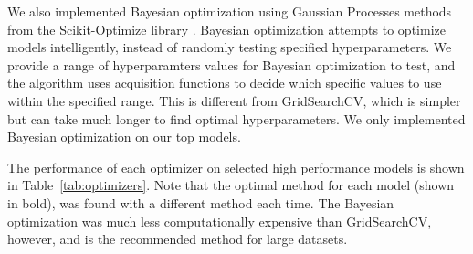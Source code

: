 \documentclass[twocolumn, nofootinbib, secnumarabic, amssymb, nobibnotes, aps, prd]{revtex4-2}
\begin{document}
We also implemented Bayesian optimization using Gaussian Processes methods from the Scikit-Optimize library \cite{head_tim_2021_5565057}. Bayesian optimization attempts to optimize models intelligently, instead of randomly testing specified hyperparameters. We provide a range of hyperparamters values for Bayesian optimization to test, and the algorithm uses acquisition functions to decide which specific values to use within the specified range. This is different from GridSearchCV, which is simpler but can take much longer to find optimal hyperparameters. We only implemented Bayesian optimization on our top models.

The performance of each optimizer on selected high performance models is shown in Table~\ref{tab:optimizers}. Note that the optimal method for each model (shown in bold), was found with a different method each time. The Bayesian optimization was much less computationally expensive than GridSearchCV, however, and is the recommended method for large datasets.
\end{document}
